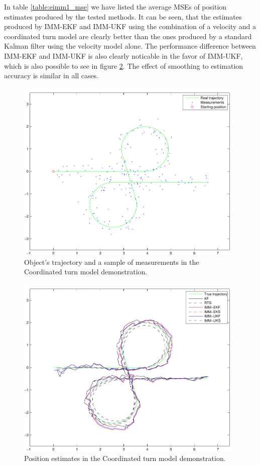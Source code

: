 In table \ref{table:eimm1_mse} we have listed the average MSEs of
position estimates produced by the tested methods. It can be seen,
that the estimates produced by IMM-EKF and IMM-UKF using the
combination of a velocity and a coordinated turn model are clearly
better than the ones produced by a standard Kalman filter using the
velocity model alone. The performance difference between IMM-EKF and
IMM-UKF is also clearly noticable in the favor of IMM-UKF, which is
also possible to see in figure \ref{fig:eimm1_1}. The effect of
smoothing to estimation accuracy is similar in all cases.


\begin{figure}
\begin{center}
\includegraphics[width=11cm]{pics/eimm1_trajectory}
\caption{ Object's trajectory and a sample of measurements in the
Coordinated turn model demonstration.  }
\label{fig:eimm1_trajectory}
\end{center}
\end{figure}

\begin{figure}
\begin{center}
\includegraphics[width=11cm]{pics/eimm1_1}
\caption{ Position estimates in the Coordinated turn model
demonstration.  }
\label{fig:eimm1_1}
\end{center}
\end{figure}

